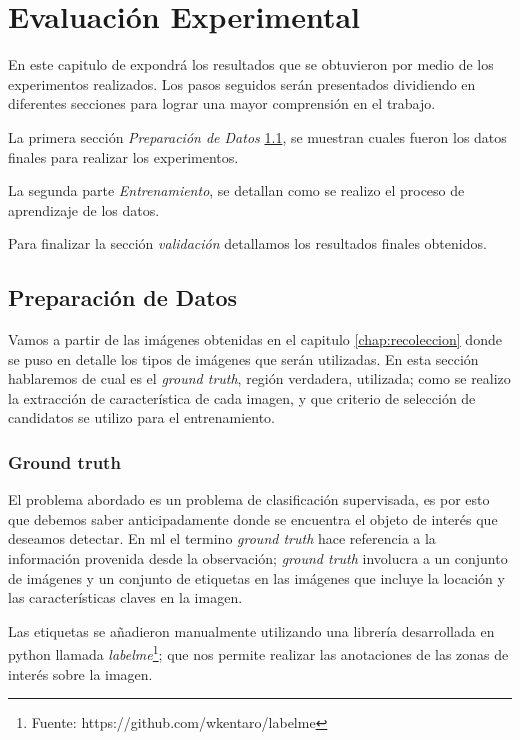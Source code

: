 \chapter{Evaluación Experimental}\label{chap:evaluacion}

En este capitulo de expondrá los resultados que se obtuvieron por medio de los experimentos realizados. Los pasos seguidos serán presentados dividiendo en diferentes secciones para lograr una mayor comprensión en el trabajo.

La primera sección \textit{Preparación de Datos} \ref{sec:preparacion_de_datos}, se muestran cuales fueron los datos finales para realizar los experimentos.

La segunda parte  \textit{Entrenamiento}, se detallan como se realizo el proceso de aprendizaje de los datos.


Para finalizar  la sección \textit{validación} detallamos los resultados finales obtenidos.


\section{Preparación de Datos}\label{sec:preparacion_de_datos}

Vamos a partir de las imágenes obtenidas en el capitulo \ref{chap:recoleccion} donde se puso en detalle los tipos de imágenes que serán utilizadas. En esta sección hablaremos de cual es el \textit{ground truth}, región verdadera, utilizada; como se realizo la extracción de característica de cada imagen, y que criterio de selección de candidatos se utilizo para el entrenamiento.

\subsection{Ground truth}\label{sub:groundtruth}

El problema abordado es un problema de clasificación supervisada, es por esto que debemos saber anticipadamente donde se encuentra el objeto de interés que deseamos detectar. En \ac{ml} el termino \textit{ground truth} hace referencia a la información provenida desde la observación; \textit{ground truth} involucra a un conjunto de imágenes y un conjunto de etiquetas en las imágenes que incluye la locación y las características claves en la imagen.

Las etiquetas se añadieron manualmente utilizando una librería desarrollada en python llamada \textit{labelme}\footnote{Fuente: 
https://github.com/wkentaro/labelme}; que nos permite realizar las anotaciones de las zonas de interés sobre la imagen.

